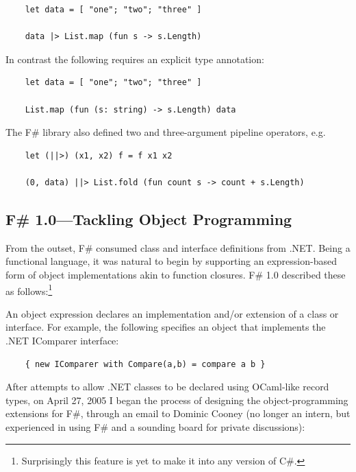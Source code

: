\documentclass[acmsmall]{acmart}\settopmatter{}
\begin{document}
\begin{verbatim}
    let data = [ "one"; "two"; "three" ] 

    data |> List.map (fun s -> s.Length)
\end{verbatim}
In contrast the following requires an explicit type annotation:
\begin{verbatim}
    let data = [ "one"; "two"; "three" ] 

    List.map (fun (s: string) -> s.Length) data
\end{verbatim}
The F\# library also defined two and three-argument pipeline operators, e.g.
\begin{verbatim}
    let (||>) (x1, x2) f = f x1 x2

    (0, data) ||> List.fold (fun count s -> count + s.Length)
\end{verbatim}

\subsection*{F\# 1.0---Tackling Object Programming}

From the outset, F\# consumed class and interface definitions from .NET. Being a functional language, it was
natural to begin by supporting an expression-based form of object implementations akin to function closures.  F\# 1.0 described these as follows:\footnote{Surprisingly this feature is yet to make it into any version of C\#.}
\begin{verbquote}
An object expression declares an implementation and/or extension of a class or interface. For example, the following specifies an object that implements the .NET IComparer interface:
\end{verbquote}
\begin{verbatim}
    { new IComparer with Compare(a,b) = compare a b }
\end{verbatim}
After attempts to allow .NET classes to be declared using OCaml-like record types, on April 27, 2005 I began the process of designing the object-programming extensions for F\#, through an email to Dominic Cooney (no longer an intern, but experienced in using F\# and a sounding board for private discussions):
\end{document}
